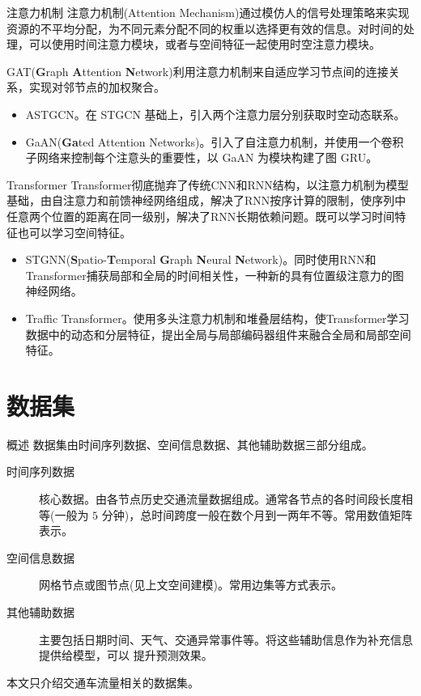 \documentclass{libs/format}
\begin{document}
\begin{frame}{注意力机制}
  注意力机制(Attention Mechanism)通过模仿人的信号处理策略来实现资源的不平均分配，为不同元素分配不同的权重以选择更有效的信息\cite{T-ZS26}。对时间的处理，可以使用时间注意力模块，或者与空间特征一起使用时空注意力模块。
  
  GAT(\textbf{G}raph \textbf{A}ttention \textbf{N}etwork)利用注意力机制来自适应学习节点间的连接关系，实现对邻节点的加权聚合。

  \begin{itemize}
    \item ASTGCN\cite{T-81}。在 STGCN 基础上，引入两个注意力层分别获取时空动态联系。
    \item GaAN(\textbf{Ga}ted Attention Networks)\cite{T-88}。引入了自注意力机制，并使用一个卷积子网络来控制每个注意头的重要性，以 GaAN 为模块构建了图 GRU。
  \end{itemize}
\end{frame}

\begin{frame}{Transformer}
  Transformer彻底抛弃了传统CNN和RNN结构，以注意力机制为模型基础，由自注意力和前馈神经网络组成，解决了RNN按序计算的限制，使序列中任意两个位置的距离在同一级别，解决了RNN长期依赖问题\cite{T-ZS6}。既可以学习时间特征也可以学习空间特征。

  \begin{itemize}
    \item STGNN(\textbf{S}patio-\textbf{T}emporal \textbf{G}raph \textbf{N}eural \textbf{N}etwork)\cite{T-173}。同时使用RNN和Transformer捕获局部和全局的时间相关性，一种新的具有位置级注意力的图神经网络。
    \item Traffic Transformer\cite{T-202}。使用多头注意力机制和堆叠层结构，使Transformer学习数据中的动态和分层特征，提出全局与局部编码器组件来融合全局和局部空间特征。
  \end{itemize}
\end{frame}

\section{数据集}

\begin{frame}{概述}
  数据集由时间序列数据、空间信息数据、其他辅助数据三部分组成。
  \begin{description}
    \item[时间序列数据] 核心数据。由各节点历史交通流量数据组成。通常各节点的各时间段长度相等(一般为 $5$ 分钟)，总时间跨度一般在数个月到一两年不等。常用数值矩阵表示。
    \item[空间信息数据] 网格节点或图节点(见上文空间建模)。常用边集等方式表示。
    \item[其他辅助数据] 主要包括日期时间、天气、交通异常事件等。将这些辅助信息作为补充信息提供给模型，可以
    提升预测效果。
  \end{description}
  本文只介绍交通车流量相关的数据集。
\end{frame}
\end{document}
